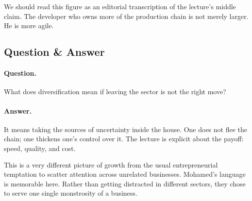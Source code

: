 \begin{figure}[h]
\centering
{}
\end{figure}

We should read this figure as an editorial transcription of the lecture's middle claim. The developer who owns more of the production chain is not merely larger. He is more agile.

\subsection{Question \& Answer}

\paragraph{Question.} What does diversification mean if leaving the sector is not the right move?

\paragraph{Answer.} It means taking the sources of uncertainty inside the house. One does not flee the chain; one thickens one's control over it. The lecture is explicit about the payoff: speed, quality, and cost.

This is a very different picture of growth from the usual entrepreneurial temptation to scatter attention across unrelated businesses. Mohamed's language is memorable here. Rather than getting distracted in different sectors, they chose to serve one single monstrosity of a business.

